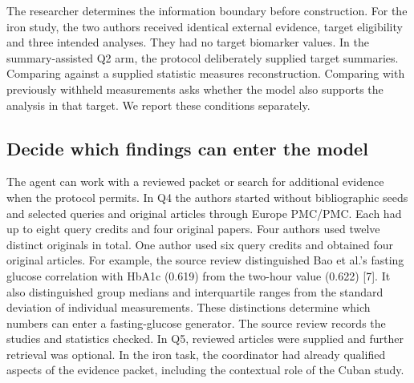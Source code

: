\documentclass[11pt,letterpaper]{article}
\begin{document}
The researcher determines the information boundary before construction. For the iron study, the two authors received identical external evidence, target eligibility and three intended analyses. They had no target biomarker values. In the summary-assisted Q2 arm, the protocol deliberately supplied target summaries. Comparing against a supplied statistic measures reconstruction. Comparing with previously withheld measurements asks whether the model also supports the analysis in that target. We report these conditions separately.


\subsection{Decide which findings can enter the model}

The agent can work with a reviewed packet or search for additional evidence when the protocol permits. In Q4 the authors started without bibliographic seeds and selected queries and original articles through Europe PMC/\allowbreak{}PMC. Each had up to eight query credits and four original papers. Four authors used twelve distinct originals in total. One author used six query credits and obtained four original articles. For example, the source review distinguished Bao et al.'s fasting glucose correlation with HbA1c (0.619) from the two-hour value (0.622) [7]. It also distinguished group medians and interquartile ranges from the standard deviation of individual measurements. These distinctions determine which numbers can enter a fasting-glucose generator. The source review records the studies and statistics checked. In Q5, reviewed articles were supplied and further retrieval was optional. In the iron task, the coordinator had already qualified aspects of the evidence packet, including the contextual role of the Cuban study.


\begingroup

\small

\renewcommand{\arraystretch}{1.22}
\end{document}
